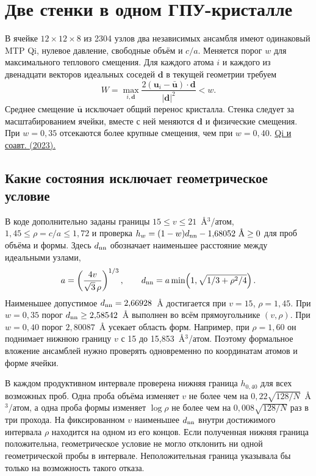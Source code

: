 \section*{Две стенки в одном ГПУ-кристалле}
В ячейке \(12\times12\times8\) из 2304 узлов два независимых ансамбля имеют одинаковый MTP Qi, нулевое давление, свободные объём и \(c/a\). Меняется порог \(w\) для максимального теплового смещения. Для каждого атома \(i\) и каждого из двенадцати векторов идеальных соседей \(\mathbf d\) в текущей геометрии требуем
\[
 W=\max_{i,\mathbf d}\frac{2(\mathbf u_i-\bar{\mathbf u})\cdot\mathbf d}{|\mathbf d|^2}<w.
\]
Среднее смещение \(\bar{\mathbf u}\) исключает общий перенос кристалла. Стенка следует за масштабированием ячейки, вместе с ней меняются \(\mathbf d\) и физические смещения. При \(w=0{,}35\) отсекаются более крупные смещения, чем при \(w=0{,}40\). \href{https://doi.org/10.1103/PhysRevMaterials.7.103602}{Qi и соавт. (2023).}

\subsection*{Какие состояния исключает геометрическое условие}
В коде дополнительно заданы границы \(15\le v\le21\)~\AA$^3$/атом, \(1{,}45\le\rho=c/a\le1{,}72\) и проверка \(h_w=(1-w)d_{\rm nn}-1{,}68052~\text{\AA}\ge0\) для проб объёма и формы. Здесь \(d_{\rm nn}\) обозначает наименьшее расстояние между идеальными узлами,
\[
 a=\left(\frac{4v}{\sqrt3\,\rho}\right)^{1/3},\qquad
 d_{\rm nn}=a\min\!\left(1,\sqrt{1/3+\rho^2/4}\right).
\]
Наименьшее допустимое \(d_{\rm nn}=2{,}66928\)~\AA{} достигается при \(v=15\), \(\rho=1{,}45\). При \(w=0{,}35\) порог \(d_{\rm nn}\ge2{,}58542\)~\AA{} выполнен во всём прямоугольнике \((v,\rho)\). При \(w=0{,}40\) порог \(2{,}80087\)~\AA{} усекает область форм. Например, при \(\rho=1{,}60\) он поднимает нижнюю границу \(v\) с 15 до 15,853~\AA$^3$/атом. Поэтому формальное вложение ансамблей нужно проверять одновременно по координатам атомов и форме ячейки.

В каждом продуктивном интервале проверена нижняя граница \(h_{0{,}40}\) для всех возможных проб. Одна проба объёма изменяет \(v\) не более чем на \(0{,}22\sqrt{128/N}\)~\AA$^3$/атом, а одна проба формы изменяет \(\log\rho\) не более чем на \(0{,}008\sqrt{128/N}\) раз в три прохода. На фиксированном \(v\) наименьшее \(d_{\rm nn}\) внутри достижимого интервала \(\rho\) находится на одном из его концов. Если полученная нижняя граница положительна, геометрическое условие не могло отклонить ни одной геометрической пробы в интервале. Неположительная граница указывала бы только на возможность такого отказа.


